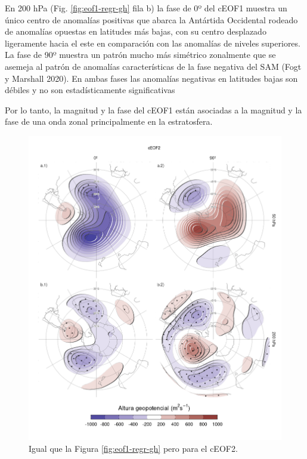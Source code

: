 \documentclass[12pt,oneside,a4paper]{reedthesis}
\begin{document}
En 200 hPa (Fig. \ref{fig:eof1-regr-gh} fila b) la fase de 0º del cEOF1 muestra un único centro de anomalías positivas que abarca la Antártida Occidental rodeado de anomalías opuestas en latitudes más bajas, con su centro desplazado ligeramente hacia el este en comparación con las anomalías de niveles superiores.
La fase de 90º muestra un patrón mucho más simétrico zonalmente que se asemeja al patrón de anomalías características de la fase negativa del SAM (Fogt y Marshall 2020).
En ambas fases las anomalías negativas en latitudes bajas son débiles y no son estadísticamente significativas

Por lo tanto, la magnitud y la fase del cEOF1 están asociadas a la magnitud y la fase de una onda zonal principalmente en la estratosfera.



\begin{figure}

{\centering \includegraphics{figures/20-ceofs/eof2-regr-gh-1} 

}

\caption{Igual que la Figura \ref{fig:eof1-regr-gh} pero para el cEOF2.}\label{fig:eof2-regr-gh}
\end{figure}
\end{document}
